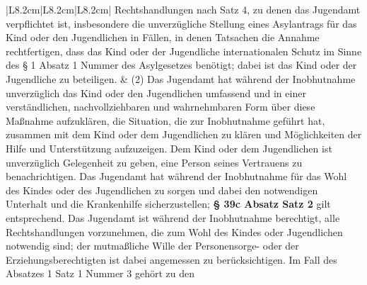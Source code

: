 \documentclass[10pt,a4paper,landscape]{article}
\begin{document}
\begin{longtable}{|L{8.2cm}|L{8.2cm}|L{8.2cm}|}
Rechtshandlungen nach Satz 4, zu  \newline denen das Jugendamt verpflichtet ist,  \newline insbesondere die unverzügliche Stellung  \newline eines Asylantrags für das Kind oder den  \newline Jugendlichen in Fällen, in denen Tatsachen  \newline die Annahme rechtfertigen, dass das Kind  \newline oder der Jugendliche internationalen  \newline Schutz im Sinne des \S{} 1 Absatz 1 Nummer   des Asylgesetzes benötigt; dabei ist das  \newline Kind oder der Jugendliche zu beteiligen. & (2) Das Jugendamt hat während der  \newline Inobhutnahme unverzüglich das Kind oder  \newline den Jugendlichen umfassend und in einer  \newline verständlichen, nachvollziehbaren und  \newline wahrnehmbaren Form über diese  \newline Maßnahme aufzuklären, die Situation, die  \newline zur Inobhutnahme geführt hat, zusammen  \newline mit dem Kind oder dem Jugendlichen zu  \newline klären und Möglichkeiten der Hilfe und  \newline Unterstützung aufzuzeigen. Dem Kind oder  \newline dem Jugendlichen ist unverzüglich  \newline Gelegenheit zu geben, eine Person seines  \newline Vertrauens zu benachrichtigen. Das  \newline Jugendamt hat während der Inobhutnahme  \newline für das Wohl des Kindes oder des  \newline Jugendlichen zu sorgen und dabei den  \newline notwendigen Unterhalt und die  \newline Krankenhilfe sicherzustellen; \textbf{\S{} 39c Absatz   Satz 2} gilt entsprechend. Das Jugendamt  \newline ist während der Inobhutnahme berechtigt,  \newline alle Rechtshandlungen vorzunehmen, die  \newline zum Wohl des Kindes oder Jugendlichen  \newline notwendig sind; der mutmaßliche Wille der  \newline Personensorge- oder der  \newline Erziehungsberechtigten ist dabei  \newline angemessen zu berücksichtigen. Im Fall  \newline des Absatzes 1 Satz 1 Nummer 3 gehört  \newline zu den 
\end{longtable}
\end{document}
